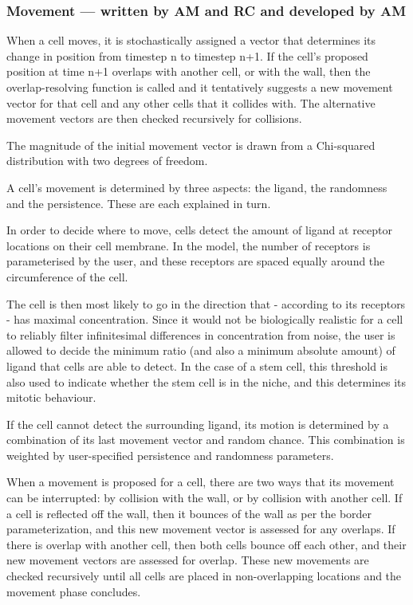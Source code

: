 \documentclass[12pt]{article}
\begin{document}
\subsubsection{Movement --- written by AM and RC and developed by AM}
When a cell moves, it is stochastically assigned a vector that 
determines its change in position from timestep n to timestep n+1. If 
the cell's proposed position at time n+1 overlaps with another cell, or 
with the wall, then the overlap-resolving function is called and it 
tentatively suggests a new movement vector for that cell and any other 
cells that it collides with. The alternative movement vectors are then 
checked recursively for collisions.

The magnitude of the initial movement vector is drawn from a Chi-squared 
distribution with two degrees of freedom. 

A cell's movement is determined by three aspects: the ligand, the 
randomness and the persistence. These are each explained in turn.

In order to decide where to move, cells detect the amount of ligand at 
receptor locations on their cell membrane. In the model, the number of 
receptors is parameterised by the user, and these receptors are spaced 
equally around the circumference of the cell. 

The cell is then most likely to go in the direction that - according to 
its receptors - has maximal concentration. Since it would not be 
biologically realistic for a cell to reliably filter infinitesimal 
differences in concentration from noise, the user is allowed to 
decide the minimum ratio (and also a minimum absolute amount) of ligand 
that cells are able to detect. In the case of a stem cell, this 
threshold is also used to indicate whether the stem cell is in the 
niche, and this determines its mitotic behaviour.

If the cell cannot detect the surrounding ligand, its motion is 
determined by a combination of its last movement vector and random 
chance. This combination is weighted by user-specified persistence and 
randomness parameters.

When a movement is proposed for a cell, there are two ways that its 
movement can be interrupted: by collision with the wall, or by collision 
with another cell. If a cell is reflected off the wall, then it bounces 
of the wall as per the border parameterization, and this new movement 
vector is assessed for any overlaps. If there is overlap with another 
cell, then both cells bounce off each other, and their new movement 
vectors are assessed for overlap. These new movements are checked 
recursively until all cells are placed in non-overlapping locations and 
the movement phase concludes.
\end{document}
